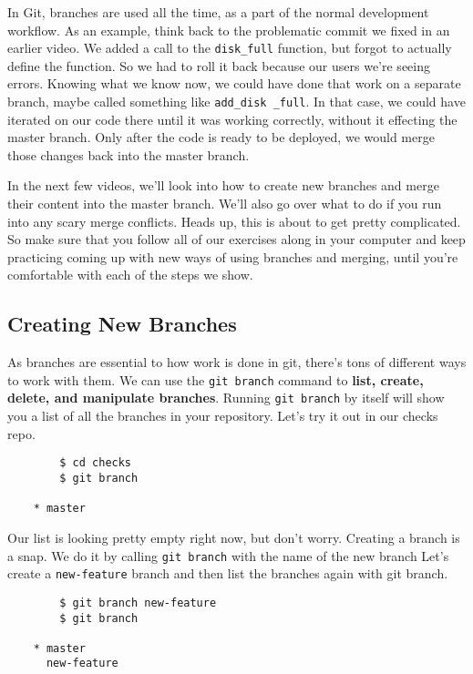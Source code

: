 	In Git, branches are used all the time, as a part of the normal development workflow. As an example, think back to the problematic commit we fixed in an earlier video. We added a call to the \verb|disk_full| function, but forgot to actually define the function. So we had to roll it back because our users we're seeing errors. Knowing what we know now, we could have done that work on a separate branch, maybe called something like 
	\verb|add_disk _full|. In that case, we could have iterated on our code there until it was working correctly, without it effecting the master branch. Only after the code is ready to be deployed, we would merge those changes back into the master branch. 
	
	In the next few videos, we'll look into how to create new branches and merge their content into the master branch. We'll also go over what to do if you run into any scary merge conflicts. Heads up, this is about to get pretty complicated. So make sure that you follow all of our exercises along in your computer and keep practicing coming up with new ways of using branches and merging, until you're comfortable with each of the steps we show.
	
	\subsection{Creating New Branches}
	
	As branches are essential to how work is done in git, there's tons of different ways to work with them. We can use the \texttt{git branch} command to \textbf{list, create, delete, and manipulate branches}. Running \texttt{git branch} by itself will show you a list of all the branches in your repository. Let's try it out in our checks repo.
	
	\begin{verbatim}
		$ cd checks
		$ git branch
		
	* master
	\end{verbatim}
	
	Our list is looking pretty empty right now, but don't worry. Creating a branch is a snap. We do it by calling \texttt{git branch} with the name of the new branch 
	Let's create a \verb|new-feature| branch and then list the branches again with git branch. 
	
	\begin{verbatim}
		$ git branch new-feature
		$ git branch
		
	* master
	  new-feature
	\end{verbatim}
	

